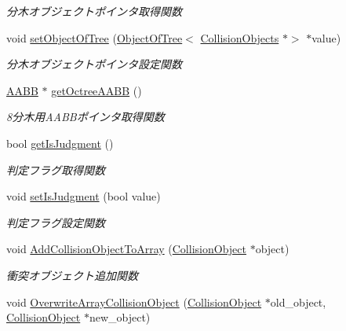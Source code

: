 \begin{DoxyCompactItemize}
\begin{DoxyCompactList}\small\item\em 分木オブジェクトポインタ取得関数 \end{DoxyCompactList}\item 
void \mbox{\hyperlink{class_collision_objects_a3d5a69741d66dcdebfae5a54a15c4b88}{set\+Object\+Of\+Tree}} (\mbox{\hyperlink{class_object_of_tree}{Object\+Of\+Tree}}$<$ \mbox{\hyperlink{class_collision_objects}{Collision\+Objects}} $\ast$$>$ $\ast$value)
\begin{DoxyCompactList}\small\item\em 分木オブジェクトポインタ設定関数 \end{DoxyCompactList}\item 
\mbox{\hyperlink{class_a_a_b_b}{A\+A\+BB}} $\ast$ \mbox{\hyperlink{class_collision_objects_a2adc85b2df5c53df2cde2dace2f2d1dd}{get\+Octree\+A\+A\+BB}} ()
\begin{DoxyCompactList}\small\item\em 8分木用\+A\+A\+B\+Bポインタ取得関数 \end{DoxyCompactList}\item 
bool \mbox{\hyperlink{class_collision_objects_a1320a57aae5798c04e65b2b7c8433aae}{get\+Is\+Judgment}} ()
\begin{DoxyCompactList}\small\item\em 判定フラグ取得関数 \end{DoxyCompactList}\item 
void \mbox{\hyperlink{class_collision_objects_a61e67c1c0ea20a01d9e4a5b2d1b45428}{set\+Is\+Judgment}} (bool value)
\begin{DoxyCompactList}\small\item\em 判定フラグ設定関数 \end{DoxyCompactList}\item 
void \mbox{\hyperlink{class_collision_objects_a50d6593f98cd04e23ad7ea9102eccc3c}{Add\+Collision\+Object\+To\+Array}} (\mbox{\hyperlink{class_collision_object}{Collision\+Object}} $\ast$object)
\begin{DoxyCompactList}\small\item\em 衝突オブジェクト追加関数 \end{DoxyCompactList}\item 
void \mbox{\hyperlink{class_collision_objects_aed8d6903485ae775d8bbff511796a653}{Overwrite\+Array\+Collision\+Object}} (\mbox{\hyperlink{class_collision_object}{Collision\+Object}} $\ast$old\+\_\+object, \mbox{\hyperlink{class_collision_object}{Collision\+Object}} $\ast$new\+\_\+object)
$$
\end{DoxyCompactItemize}
